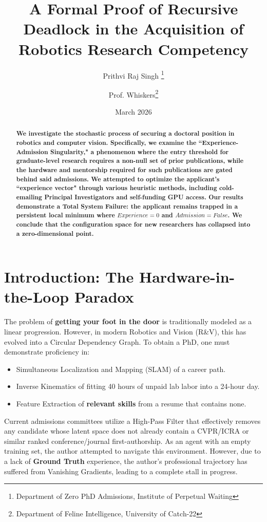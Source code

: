\documentclass[letterpaper]{article}
\title{A Formal Proof of Recursive Deadlock in the Acquisition of Robotics Research Competency}
\author{
  Prithvi Raj Singh \thanks{Department of Zero PhD Admissions, Institute of Perpetual Waiting}  \\
  \and
  Prof. Whiskers\thanks{Department of Feline Intelligence, University of Catch-22} 
}
\date{March 2026}
\begin{document}
\maketitle

\vspace{-2em}
\begin{abstract}
    \textbf{We investigate the stochastic process of securing a doctoral position in robotics and computer vision. Specifically, we examine the ``Experience-Admission Singularity," a phenomenon where the entry threshold for graduate-level research requires a non-null set of prior publications, while the hardware and mentorship required for such publications are gated behind said admissions. We attempted to optimize the applicant’s ``experience vector" through various heuristic methods, including cold-emailing Principal Investigators and self-funding GPU access. Our results demonstrate a Total System Failure: the applicant remains trapped in a persistent local minimum where $Experience = 0$ and $Admission = False$. We conclude that the configuration space for new researchers has collapsed into a zero-dimensional point.} 

\end{abstract}



\section{Introduction: The Hardware-in-the-Loop Paradox}
The problem of \textbf{getting your foot in the door} is traditionally modeled as a linear progression. However, in modern Robotics and Vision (R\&V), this has evolved into a Circular Dependency Graph. To obtain a PhD, one must demonstrate proficiency in:
\begin{itemize}
    \item Simultaneous Localization and Mapping (SLAM) of a career path.
    \item Inverse Kinematics of fitting 40 hours of unpaid lab labor into a 24-hour day.
    \item Feature Extraction of \textbf{relevant skills} from a resume that contains none.
\end{itemize}
Current admissions committees utilize a High-Pass Filter that effectively removes any candidate whose latent space does not already contain a CVPR/ICRA or similar ranked conference/journal first-authorship. As an agent with an empty training set, the author attempted to navigate this environment. However, due to a lack of \textbf{Ground Truth} experience, the author’s professional trajectory has suffered from Vanishing Gradients, leading to a complete stall in progress.
\end{document}
